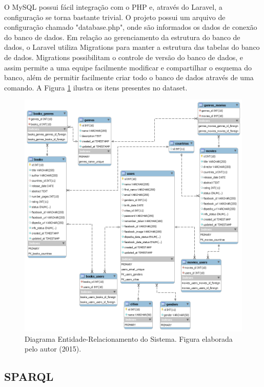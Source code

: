 O MySQL possui fácil integração com o PHP e, através do Laravel, a configuração se torna bastante trivial. O projeto possui um arquivo de configuração chamado "database.php", onde são informados os dados de conexão do banco de dados. Em relação ao gerenciamento da estrutura do banco de dados, o Laravel utiliza Migrations para manter a estrutura das tabelas do banco de dados. Migrations possibilitam o controle de versão do banco de dados, e assim permite a uma equipe facilmente modificar e compartilhar o esquema do banco, além de permitir facilmente criar todo o banco de dados através de uma comando. A Figura \ref{fig:banco-dados} ilustra os itens presentes no dataset.

\begin{figure}
	\centering
	\advance\leftskip-2cm
	\includegraphics[scale=0.61]{imagens/banco.png}
	\caption{Diagrama Entidade-Relacionamento do Sistema. Figura elaborada pelo autor (2015).}
	\label{fig:banco-dados}
\end{figure}





\subsection{SPARQL}

